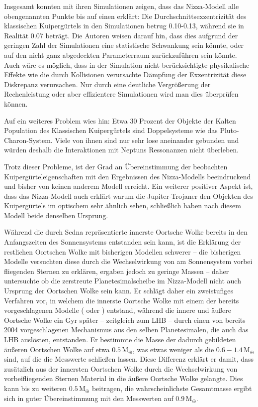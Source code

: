 \documentclass[12pt,a4paper,twoside]{article}
\newcommand{\ME}{\,\mathrm{M_\oplus}}
\begin{document}
Insgesamt konnten \cite{Levison2008}mit ihren Simulationen zeigen, dass das Nizza-Modell alle obengenannten Punkte bis auf einen erklärt: Die Durchschnittsexzentrizität des klassischen Kuipergürtels in den Simulationen betrug 0.10-0.13, während sie in Realität 0.07 beträgt.
Die Autoren weisen darauf hin, dass dies aufgrund der geringen Zahl der Simulationen eine statistische Schwankung sein könnte, oder auf den nicht ganz abgedeckten Parameterraum zurückzuführen sein könnte. Auch wäre es möglich, dass in der Simulation nicht berücksichtigte physikalische Effekte wie die durch Kollisionen verursachte Dämpfung der Exzentrizität diese Diskrepanz verursachen\cite{Levison2008}.
Nur durch eine deutliche Vergrößerung der Rechenleistung oder aber effizientere Simulationen wird man dies überprüfen können.

Auf ein weiteres Problem wies \cite{Parker2010} hin:
Etwa 30 Prozent der Objekte der Kalten Population des Klassischen Kuipergürtels sind Doppelsysteme wie das Pluto-Charon-System. %
Viele von ihnen sind nur sehr lose aneinander gebunden und würden deshalb die Interaktionen mit Neptuns Ressonanzen nicht überleben.

Trotz dieser Probleme, ist der Grad an Übereinstimmung der beobachten Kuiper\-gürtel\-eigen\-schaften mit den Ergebnissen des Nizza-Modells beeindruckend und bisher von keinen anderem Modell erreicht. %
Ein weiterer positiver Aspekt ist, dass das Nizza-Modell auch erklärt warum die Jupiter-Trojaner den Objekten des Kuipergürtels im optischem sehr ähnlich sehen, schließlich haben nach diesem Modell beide denselben Ursprung\cite{Morbidelli2005}.

Während die durch Sedna repräsentierte innerste Oortsche Wolke bereits in den Anfangszeiten des Sonnensystems entstanden sein kann, ist die Erklärung der restlichen Oortschen Wolke mit bisherigen Modellen schwerer – die bisherigen Modelle versuchten diese durch die Wechselwirkung von am Sonnensystem vorbei fliegenden Sternen zu erklären, ergaben jedoch zu geringe Massen – daher untersuchte \cite{Brasser2008} ob die zerstreute Planetesimalscheibe im Nizza-Modell nicht auch Ursprung der Oortschen Wolke sein kann.
Er schlägt daher ein zweistufiges Verfahren vor, in welchem die innerste Oortsche Wolke mit einem der bereits vorgeschlagenen Modelle (\cite{Brasser2006,Brasser2007} oder \cite{Kaib2008}) entstand, während die innere und äußere Oortsche Wolke ein Gyr später – zeitgleich zum LHB – durch einen von \cite{Dones2004} bereits 2004 vorgeschlagenen Mechanismus aus den selben Planetesimalen, die auch das LHB auslösten, entstanden\cite{Brasser2008}.
Er bestimmte die Masse der dadurch gebildeten äußeren Oortschen Wolke auf etwa $0.5 \ME$, was etwas weniger als die $0.6-1.4 \ME$ sind, auf die die Messwerte schließen lassen\cite{Brasser2008}. Diese Differenz erklärt er damit, dass zusätzlich aus der innersten Oortschen Wolke durch die Wechselwirkung von vorbeifliegenden Sternen Material in die äußere Oortsche Wolke gelangte\cite{Brasser2008}.
Dies kann bis zu weiteren $0.5 \ME$ beitragen, die wahrscheinlichste Gesamtmasse ergibt sich in guter Übereinstimmung mit den Messwerten auf $0.9 \ME$\cite{Brasser2008}.
\end{document}
